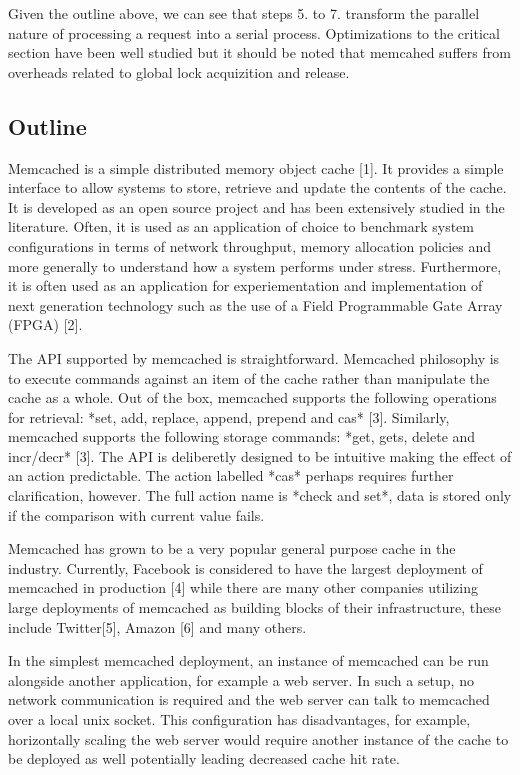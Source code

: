 Given the outline above, we can see that steps 5. to 7. transform the parallel nature of processing a request into a serial process. Optimizations to the critical section have been well studied but it should be noted that memcahed suffers from overheads related to global lock acquizition and release.

\subsection{Outline}
Memcached is a simple distributed memory object cache [1]. It provides a simple interface to allow systems to store, retrieve and update the contents of the cache. It is developed as an open source project and has been extensively studied in the literature. Often, it is used as an application of choice to benchmark system configurations in terms of network
throughput, memory allocation policies and more generally to understand how a system performs under stress. Furthermore, it is often used as an application for experiementation and implementation of next generation technology such as the use of a Field Programmable Gate Array (FPGA) [2].

The API supported by memcached is straightforward. Memcached philosophy is to execute commands against an item of the cache rather than manipulate the cache as a whole. Out of the box, memcached supports the following operations for retrieval: *set, add, replace, append, prepend and cas* [3]. Similarly, memcached supports the following storage commands: *get, gets, delete and incr/decr* [3]. The API is deliberetly designed to be intuitive making the effect of an action predictable. The action labelled *cas* perhaps requires further clarification, however. The full action name is *check and set*, data is stored only if the comparison with current value fails.

Memcached has grown to be a very popular general purpose cache in the industry. Currently, Facebook is considered to have the largest deployment of memcached in production [4] while there are many other companies utilizing large deployments of memcached as building blocks of their infrastructure, these include Twitter[5], Amazon [6] and many others.

In the simplest memcached deployment, an instance of memcached can be run alongside another application, for example a web server. In such a setup, no network communication is required and the web server can talk to memcached over a local unix socket. This configuration has disadvantages, for example, horizontally scaling the web server would require another instance of the cache to be deployed as well potentially leading decreased cache hit rate.

